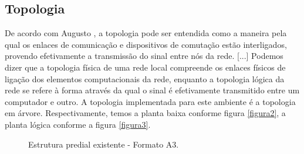 \documentclass[	DIV=calc,%
							paper=a4,%
							fontsize=12pt,%
							onecolumn]{scrartcl}	 					%
\begin{document}

\subsection{Topologia}
De acordo com Augusto \cite{ID1}, a topologia pode ser entendida como a maneira pela qual os enlaces de comunicação e dispositivos de comutação estão interligados, provendo efetivamente a transmissão do sinal entre nós da rede. [...] Podemos dizer que a topologia física de uma rede local compreende os enlaces físicos de ligação dos elementos computacionais da rede, enquanto a topologia lógica da rede se refere à forma através da qual o sinal é efetivamente transmitido entre um computador e outro. A topologia implementada para este ambiente é a topologia em árvore. Respectivamente, temos a planta baixa conforme figura \ref{figura2}, a planta lógica conforme a figura \ref{figura3}.



\clearpage
\thispagestyle{plain}

\recalctypearea

\begin{figure}
	\noindent{}
	\caption{Estrutura predial existente - Formato A3.}
	\label{figura1}
\end{figure}

\clearpage
{}
\recalctypearea



\end{document}
